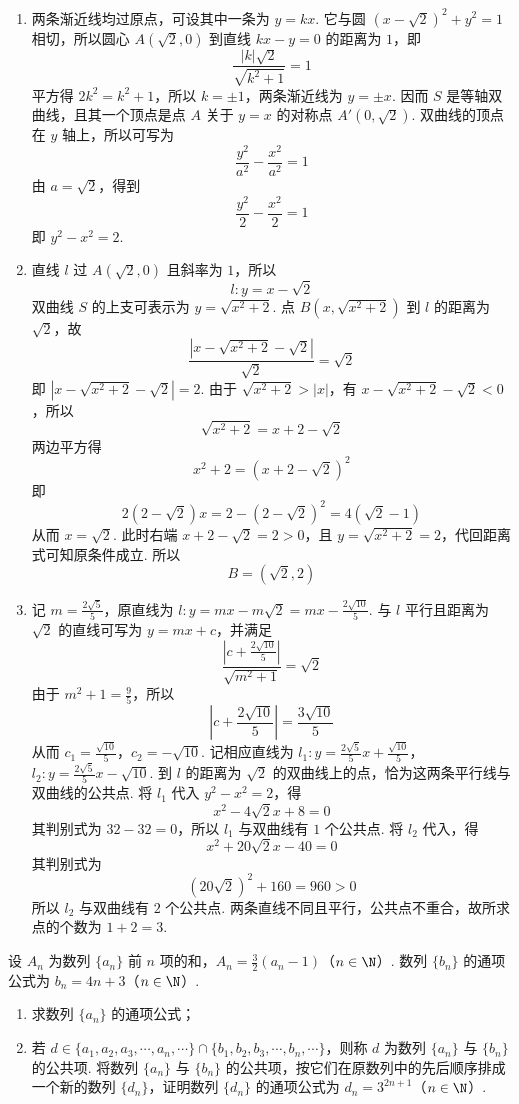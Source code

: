 \begin{solution}
\begin{enumerate}
\item 两条渐近线均过原点，可设其中一条为 \(y=kx\). 它与圆
\(\left(x-\sqrt{2}\right)^2+y^2=1\) 相切，所以圆心 \(A(\sqrt{2},0)\) 到直线 \(kx-y=0\) 的距离为 \(1\)，即
\[
\frac{|k|\sqrt{2}}{\sqrt{k^2+1}}=1
\]
平方得 \(2k^2=k^2+1\)，所以 \(k=\pm1\)，两条渐近线为 \(y=\pm x\). 因而 \(S\) 是等轴双曲线，且其一个顶点是点 \(A\) 关于 \(y=x\) 的对称点 \(A'(0,\sqrt{2})\). 双曲线的顶点在 \(y\) 轴上，所以可写为
\[
\frac{y^2}{a^2}-\frac{x^2}{a^2}=1
\]
由 \(a=\sqrt{2}\)，得到
\[
\frac{y^2}{2}-\frac{x^2}{2}=1
\]
即 \(y^2-x^2=2\).

\item 直线 \(l\) 过 \(A(\sqrt{2},0)\) 且斜率为 \(1\)，所以
\[
l:y=x-\sqrt{2}
\]
双曲线 \(S\) 的上支可表示为 \(y=\sqrt{x^2+2}\). 点 \(B\left(x,\sqrt{x^2+2}\right)\) 到 \(l\) 的距离为 \(\sqrt{2}\)，故
\[
\frac{\left|x-\sqrt{x^2+2}-\sqrt{2}\right|}{\sqrt{2}}=\sqrt{2}
\]
即 \(\left|x-\sqrt{x^2+2}-\sqrt{2}\right|=2\). 由于
\(\sqrt{x^2+2}>|x|\)，有 \(x-\sqrt{x^2+2}-\sqrt{2}<0\)，所以
\[
\sqrt{x^2+2}=x+2-\sqrt{2}
\]
两边平方得
\[
x^2+2=(x+2-\sqrt{2})^2
\]
即
\[
2(2-\sqrt{2})x=2-(2-\sqrt{2})^2=4(\sqrt{2}-1)
\]
从而 \(x=\sqrt{2}\). 此时右端 \(x+2-\sqrt{2}=2>0\)，且
\(y=\sqrt{x^2+2}=2\)，代回距离式可知原条件成立. 所以
\[
B=(\sqrt{2},2)
\]

\item 记 \(m=\frac{2\sqrt{5}}{5}\)，原直线为 \(l:y=mx-m\sqrt{2}=mx-\frac{2\sqrt{10}}{5}\). 与 \(l\) 平行且距离为 \(\sqrt{2}\) 的直线可写为 \(y=mx+c\)，并满足
\[
\frac{\left|c+\frac{2\sqrt{10}}{5}\right|}{\sqrt{m^2+1}}=\sqrt{2}
\]
由于 \(m^2+1=\frac{9}{5}\)，所以
\[
\left|c+\frac{2\sqrt{10}}{5}\right|=\frac{3\sqrt{10}}{5}
\]
从而
\(c_1=\frac{\sqrt{10}}{5}\)，\(c_2=-\sqrt{10}\).
记相应直线为
\(l_1:y=\frac{2\sqrt{5}}{5}x+\frac{\sqrt{10}}{5}\)，\(l_2:y=\frac{2\sqrt{5}}{5}x-\sqrt{10}\).
到 \(l\) 的距离为 \(\sqrt{2}\) 的双曲线上的点，恰为这两条平行线与双曲线的公共点. 将 \(l_1\) 代入 \(y^2-x^2=2\)，得
\[
x^2-4\sqrt{2}x+8=0
\]
其判别式为 \(32-32=0\)，所以 \(l_1\) 与双曲线有 \(1\) 个公共点. 将 \(l_2\) 代入，得
\[
x^2+20\sqrt{2}x-40=0
\]
其判别式为
\[
(20\sqrt{2})^2+160=960>0
\]
所以 \(l_2\) 与双曲线有 \(2\) 个公共点. 两条直线不同且平行，公共点不重合，故所求点的个数为 \(1+2=3\).
\end{enumerate}
\end{solution}

\begin{problem}
设 \(A_n\) 为数列 \(\{a_n\}\) 前 \(n\) 项的和，\(A_n=\frac{3}{2}(a_n-1)\)（\(n\in\N\)）. 数列 \(\{b_n\}\) 的通项公式为 \(b_n=4n+3\)（\(n\in\N\)）.

\begin{enumerate}
\item 求数列 \(\{a_n\}\) 的通项公式；
\item 若 \(d\in\{a_1,a_2,a_3,\cdots,a_n,\cdots\}\cap\{b_1,b_2,b_3,\cdots,b_n,\cdots\}\)，则称 \(d\) 为数列 \(\{a_n\}\) 与 \(\{b_n\}\) 的公共项. 将数列 \(\{a_n\}\) 与 \(\{b_n\}\) 的公共项，按它们在原数列中的先后顺序排成一个新的数列 \(\{d_n\}\)，证明数列 \(\{d_n\}\) 的通项公式为 \(d_n=3^{2n+1}\)（\(n\in\N\)）.
\end{enumerate}
\end{problem}

